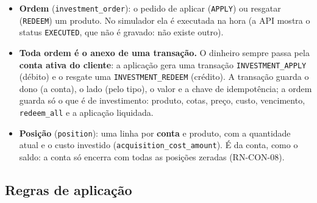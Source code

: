 \documentclass[11pt,a4paper]{article}
\newcommand{\tb}[1]{\texttt{#1}}           %
\begin{document}
\begin{itemize}
  \item \textbf{Ordem} (\tb{investment_order}): o pedido de aplicar (\tb{APPLY}) ou resgatar
  (\tb{REDEEM}) um produto. No simulador ela é executada na hora (a API mostra o status
  \tb{EXECUTED}, que não é gravado: não existe outro).
  \item \textbf{Toda ordem é o anexo de uma transação.} O dinheiro sempre passa pela \textbf{conta
  ativa do cliente}: a aplicação gera uma transação \tb{INVESTMENT_APPLY} (débito) e o resgate uma
  \tb{INVESTMENT_REDEEM} (crédito). A transação guarda o dono (a conta), o lado (pelo tipo), o
  valor e a chave de idempotência; a ordem guarda só o que é de investimento: produto, cotas,
  preço, custo, vencimento, \tb{redeem_all} e a aplicação liquidada.
  \item \textbf{Posição} (\tb{position}): uma linha por \textbf{conta} e produto, com a quantidade
  atual e o custo investido (\tb{acquisition_cost_amount}). É da conta, como o saldo: a conta só encerra
  com todas as posições zeradas (RN-CON-08).
\end{itemize}

\subsection{Regras de aplicação}
\end{document}
